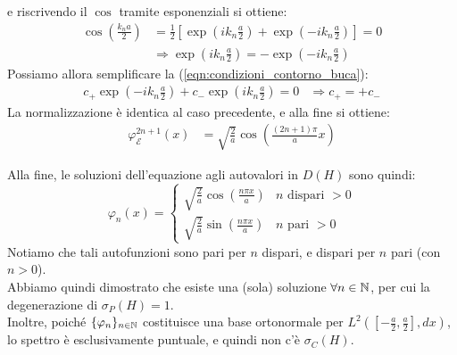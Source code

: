 \documentclass[../../FisicaTeorica.tex]{subfiles}
\begin{document}
\begin{enumerate}[label=\alph*)]
\[\]
e riscrivendo il $\cos$ tramite esponenziali si ottiene:
\begin{align*}
\cos\left(\frac{k_n a}{2}\right ) &= \frac{1}{2}\left [
\exp\left(i k_n \frac{a}{2}\right)+\exp\left(-ik_n\frac{a}{2}\right)
\right ] = 0\\
&\Rightarrow \exp\left({ik_n \frac{a}{2}}\right)=-\exp\left({-ik_n\frac{a}{2}}\right)
\end{align*}
Possiamo allora semplificare la (\ref{eqn:condizioni_contorno_buca}):
\begin{align*}
c_+ \exp\left({-ik_n\frac{a}{2}}\right)+c_- \exp\left({ik_n \frac{a}{2}}\right)=0 &\Rightarrow c_+ = +c_-
\end{align*}
La normalizzazione è identica al caso precedente, e alla fine si ottiene:
\begin{align*}
\varphi_{\mathcal{E}}^{2n+1}(x)&=\sqrt{\frac{2}{a}}\cos\left(\frac{(2n+1)\pi}{a} x\right)
\end{align*}
\end{enumerate}
Alla fine, le soluzioni dell'equazione agli autovalori in $D(H)$ sono quindi:
\[
\varphi_n(x) = \begin{cases}
\sqrt{\frac{2}{a}}\cos\left(\frac{n\pi x}{a}\right) & n \text{ dispari } >0\\
\sqrt{\frac{2}{a}}\sin\left(\frac{n\pi x}{a}\right) &
n \text{ pari } > 0
\end{cases}
\]
Notiamo che tali autofunzioni sono pari per $n$ dispari, e dispari per $n$ pari (con $n>0$).\\
Abbiamo quindi dimostrato che esiste una (sola) soluzione $\forall n \in \mathbb{N}$, per cui la degenerazione di $\sigma_P(H)=1$.\\
Inoltre, poiché $\{\varphi_n\}_{n\in\mathbb{N}}$ costituisce una base ortonormale per $L^2([-\frac{a}{2},\frac{a}{2}],dx)$, lo spettro è esclusivamente puntuale, e quindi non c'è $\sigma_C(H)$.\\
\end{document}
